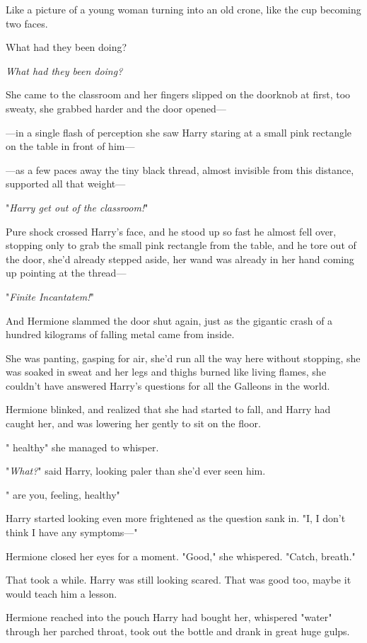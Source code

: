 Like a picture of a young woman turning into an old crone, like the cup
becoming two faces.

What had they been doing?

\emph{What had they been doing?}

She came to the classroom and her fingers slipped on the doorknob at first, too
sweaty, she grabbed harder and the door opened---

---in a single flash of perception she saw Harry staring at a small pink
rectangle on the table in front of him---

---as a few paces away the tiny black thread, almost invisible from this
distance, supported all that weight---

"\emph{Harry get out of the classroom!}"

Pure shock crossed Harry's face, and he stood up so fast he almost fell over,
stopping only to grab the small pink rectangle from the table, and he tore out
of the door, she'd already stepped aside, her wand was already in her hand
coming up pointing at the thread---

"\emph{Finite Incantatem!}"

And Hermione slammed the door shut again, just as the gigantic crash of a
hundred kilograms of falling metal came from inside.

She was panting, gasping for air, she'd run all the way here without stopping,
she was soaked in sweat and her legs and thighs burned like living flames, she
couldn't have answered Harry's questions for all the Galleons in the world.

Hermione blinked, and realized that she had started to fall, and Harry had
caught her, and was lowering her gently to sit on the floor.

"{\el} healthy{\el}" she managed to whisper.

"\emph{What?}" said Harry, looking paler than she'd ever seen him.

"{\el} are you, feeling, healthy{\el}"

Harry started looking even more frightened as the question sank in. "I, I don't
think I have any symptoms\mbox{---}"

Hermione closed her eyes for a moment. "Good," she whispered. "Catch, breath."

That took a while. Harry was still looking scared. That was good too, maybe it
would teach him a lesson.

Hermione reached into the pouch Harry had bought her, whispered "water" through
her parched throat, took out the bottle and drank in great huge gulps.

